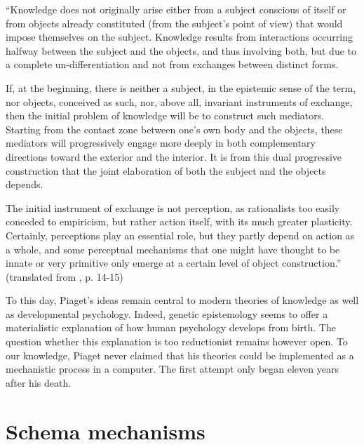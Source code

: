 \documentclass[runningheads]{llncs}
\begin{document}
\begin{adjustwidth}{1cm}{1cm}
``Knowledge does not originally arise either from a subject conscious of itself or from objects already constituted (from the subject's point of view) that would impose themselves on the subject. 
Knowledge results from interactions occurring halfway between the subject and the objects, and thus involving both, but due to a complete un-differentiation and not from exchanges between distinct forms.

If, at the beginning, there is neither a subject, in the epistemic sense of the term, nor objects, conceived as such, nor, above all, invariant instruments of exchange, then the initial problem of knowledge will be to construct such mediators. 
Starting from the contact zone between one's own body and the objects, these mediators will progressively engage more deeply in both complementary directions toward the exterior and the interior. 
It is from this dual progressive construction that the joint elaboration of both the subject and the objects depends.

The initial instrument of exchange is not perception, as rationalists too easily conceded to empiricism, but rather action itself, with its much greater plasticity. 
Certainly, perceptions play an essential role, but they partly depend on action as a whole, and some perceptual mechanisms that one might have thought to be innate or very primitive only emerge at a certain level of object construction.'' (translated from \cite{piaget_lepistemologie_2011}, p. 14-15)
\\

\end{adjustwidth}

To this day, Piaget's ideas remain central to modern theories of knowledge as well as developmental psychology. 
Indeed, genetic epistemology seems to offer a materialistic explanation of how human psychology develops from birth.
The question whether this explanation is too reductionist remains however open. 
To our knowledge, Piaget never claimed that his theories could be implemented as a mechanistic process in a computer. 
The first attempt only began eleven years after his death.

\cite{chaput_constructivist_2004}
\cite{guerin_piagetian_2008}
\cite{miller_building_2018}


\section{Schema mechanisms}
\end{document}

